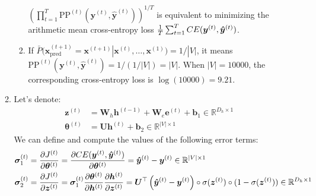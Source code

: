 \documentclass[10pt,reqno]{amsart}
\begin{document}
\begin{enumerate}[topsep=0pt,itemsep=3ex,partopsep=1ex,parsep=1ex]
\begin{enumerate}[itemsep=2ex]
\begin{enumerate}[itemsep=2ex]
        $\left( \prod^T_{t=1} \text{PP}^{(t)}(\bm{y}^{(t)}, \bm{\hat{y}}^{(t)}) \right)^{1/T}$
        is equivalent to minimizing the arithmetic mean cross-entropy loss 
        $\frac{1}{T} \sum^T_{t=1} CE(\bm{y}^{(t)}, \bm{\hat{y}}^{(t)})$. 
      \item
        If $\bar{P}(\bm{x}^{(t+1)}_\text{pred} = \bm{x}^{(t+1)} | \bm{x}^{(t)}, \dots, \bm{x}^{(1)}) = 1/|V|$,
        it means $\text{PP}^{(t)}(\bm{y}^{(t)}, \bm{\hat{y}}^{(t)}) = 1/(1/|V|) = |V|$. 
        When $|V| = 10000$, the corresponding cross-entropy loss is $\log(10000) = 9.21$.
    \end{enumerate}
  \item
    Let's denote:
    \begin{align*}
      \bm{z}^{(t)} &= \bm{W}_h \bm{h}^{(t-1)} + \bm{W}_e \bm{e}^{(t)} + \bm{b}_1 \in \mathbb{R}^{D_h\times1} \\
      \bm{\theta}^{(t)} &= \bm{U} \bm{h}^{(t)} + \bm{b}_2 \in \mathbb{R}^{|V|\times1} 
    \end{align*}
    We can define and compute the values of the following error terms:
    \begin{align*}
      \bm{\sigma}^{(t)}_1 &= \frac{\partial J^{(t)}}{\partial \bm{\theta}^{(t)}}
      = \frac{\partial CE(\bm{y}^{(t)}, \bm{\hat{y}}^{(t)})}{\partial \bm{\theta}^{(t)}}
      = \bm{\hat{y}}^{(t)} - \bm{y}^{(t)} 
      \in \mathbb{R}^{|V|\times1} \\
      \bm{\sigma}^{(t)}_2 &= \frac{\partial J^{(t)}}{\partial \bm{z}^{(t)}}
      = \bm{\sigma}^{(t)}_1 \frac{\partial \bm{\theta}^{(t)}}{\partial \bm{h}^{(t)}} \frac{\partial \bm{h}^{(t)}}{\partial \bm{z}^{(t)}}
      = \bm{U}^\top \left(\bm{\hat{y}}^{(t)} - \bm{y}^{(t)} \right) \circ \sigma(\bm{z}^{(t)}) \circ (1 - \sigma(\bm{z}^{(t)}))
      \in \mathbb{R}^{D_h\times1}
    \end{align*}
    

\end{enumerate}
\end{enumerate}
\end{document}
